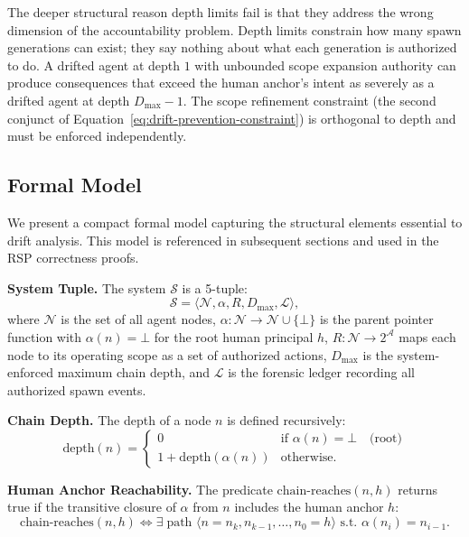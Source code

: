 The deeper structural reason depth limits fail is that they address the wrong dimension of the accountability problem. Depth limits constrain how many spawn generations can exist; they say nothing about what each generation is authorized to do. A drifted agent at depth $1$ with unbounded scope expansion authority can produce consequences that exceed the human anchor's intent as severely as a drifted agent at depth $D_{\max} - 1$. The scope refinement constraint (the second conjunct of Equation~\ref{eq:drift-prevention-constraint}) is orthogonal to depth and must be enforced independently.

\subsection{Formal Model}
\label{sec:drift-model}

We present a compact formal model capturing the structural elements essential to drift analysis. This model is referenced in subsequent sections and used in the RSP correctness proofs.

\medskip
\noindent\textbf{System Tuple.}
The system $\mathcal{S}$ is a 5-tuple:
\begin{equation}
\mathcal{S} = \langle \mathcal{N}, \alpha, R, D_{\max}, \mathcal{L} \rangle,
\label{eq:system-model}
\end{equation}
where $\mathcal{N}$ is the set of all agent nodes, $\alpha: \mathcal{N} \rightarrow \mathcal{N} \cup \{\bot\}$ is the parent pointer function with $\alpha(n) = \bot$ for the root human principal $h$, $R: \mathcal{N} \rightarrow 2^{\mathcal{A}}$ maps each node to its operating scope as a set of authorized actions, $D_{\max}$ is the system-enforced maximum chain depth, and $\mathcal{L}$ is the forensic ledger recording all authorized spawn events.

\medskip
\noindent\textbf{Chain Depth.}
The depth of a node $n$ is defined recursively:
\begin{equation}
\text{depth}(n) = 
\begin{cases}
0 & \text{if } \alpha(n) = \bot \quad \text{(root)} \\[4pt]
1 + \text{depth}(\alpha(n)) & \text{otherwise}.
\end{cases}
\label{eq:depth}
\end{equation}

\medskip
\noindent\textbf{Human Anchor Reachability.}
The predicate $\text{chain-reaches}(n, h)$ returns true if the transitive closure of $\alpha$ from $n$ includes the human anchor $h$:
\begin{equation}
\text{chain-reaches}(n, h) \iff \exists\; \text{path } \langle n = n_k, n_{k-1}, \ldots, n_0 = h \rangle \text{ s.t. } \alpha(n_i) = n_{i-1}.
\label{eq:chain-reaches}
\end{equation}

